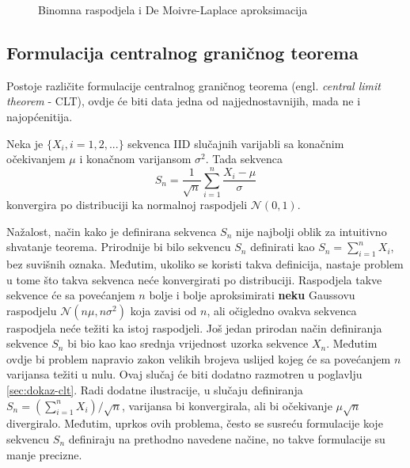 \begin{figure}[H]
  \centering
	\caption{Binomna raspodjela i De Moivre-Laplace aproksimacija}
  \label{fig:binom}
\end{figure}

\subsection{Formulacija centralnog graničnog teorema}

Postoje različite formulacije centralnog graničnog teorema (engl.
\textit{central limit theorem} - CLT), ovdje će biti data jedna od
najjednostavnijih, mada ne i najopćenitija.
\begin{theorem} \label{th:clt}
  Neka je $\{X_i, i=1,2,...\}$ sekvenca IID slučajnih varijabli sa
  konačnim očekivanjem $\mu$ i konačnom varijansom $\sigma^2$. Tada
  sekvenca
  \begin{equation}
    S_n = \frac{1}{\sqrt{n}} \sum_{i=1}^{n} \frac{X_i-\mu}{\sigma}
  \end{equation}
  konvergira po distribuciji ka normalnoj raspodjeli $\mathcal{N}(0, 1)$.
\end{theorem}

Nažalost, način kako je definirana sekvenca $S_n$ nije najbolji oblik za
intuitivno shvatanje teorema. Prirodnije bi bilo sekvencu $S_n$ definirati kao
$S_n=\sum_{i=1}^{n} X_i$, bez suvišnih oznaka. Međutim, ukoliko se koristi takva
definicija, nastaje problem u tome što takva sekvenca neće konvergirati po
distribuciji. Raspodjela takve sekvence će sa povećanjem $n$ bolje i bolje
aproksimirati \textbf{neku} Gaussovu raspodjelu $\mathcal{N}(n\mu,n\sigma^2)$
koja zavisi od $n$, ali očigledno ovakva sekvenca raspodjela neće težiti ka
istoj raspodjeli. Još jedan prirodan način definiranja sekvence $S_n$ bi bio kao
kao srednja vrijednost uzorka sekvence $X_n$. Međutim ovdje bi problem napravio
zakon velikih brojeva uslijed kojeg će sa povećanjem $n$ varijansa težiti u
nulu. Ovaj slučaj će biti dodatno razmotren u poglavlju \ref{sec:dokaz-clt}.
Radi dodatne ilustracije, u slučaju definiranja $S_n = \left(\sum_{i=1}^n
X_i\right)/\sqrt{n}$, varijansa bi konvergirala, ali bi očekivanje $\mu
\sqrt{n}$ divergiralo. Međutim, uprkos ovih problema, često se susreću
formulacije koje sekvencu $S_n$ definiraju na prethodno navedene načine, no
takve formulacije su manje precizne. \\

